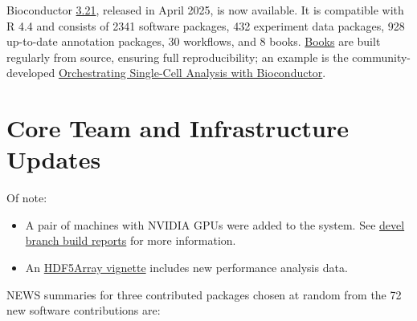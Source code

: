 Bioconductor \href{https://bioconductor.org/news/bioc_3_21_release/}{3.21}, released in April 2025, is now available. It is
compatible with R 4.4 and consists of 2341 software packages, 432
experiment data packages, 928 up-to-date annotation packages, 30
workflows, and 8 books. \href{https://bioconductor.org/books/release/}{Books} are
built regularly from source, ensuring full reproducibility; an example is the
community-developed \href{https://bioconductor.org/books/release/OSCA/}{Orchestrating Single-Cell Analysis with Bioconductor}.

\section{Core Team and Infrastructure Updates}\label{core-team-and-infrastructure-updates}

Of note:

\begin{itemize}
\tightlist
\item
  A pair of machines with NVIDIA GPUs were added to the system. See
  \href{https://bioconductor.org/checkResults/3.22/bioc-gpu-LATEST/}{devel branch build reports} for
  more information.
\item
  An \href{https://bioconductor.org/packages/release/bioc/vignettes/HDF5Array/inst/doc/HDF5Array_performance.html}{HDF5Array vignette} includes new performance analysis data.
\end{itemize}

NEWS summaries for three contributed packages chosen at random from the 72 new software contributions are:

